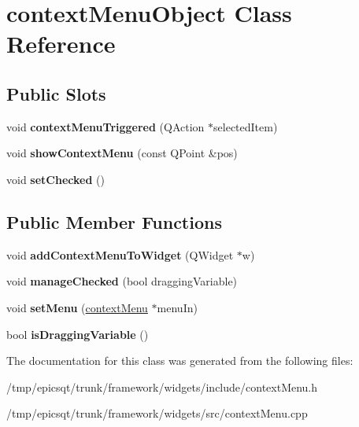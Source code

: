 \hypertarget{classcontextMenuObject}{
\section{contextMenuObject Class Reference}
\label{classcontextMenuObject}
}
\subsection*{Public Slots}
\begin{DoxyCompactItemize}
\item 
\hypertarget{classcontextMenuObject_a832f6bf39f7f9140248cf0cc5fc6956b}{
void {\bfseries contextMenuTriggered} (QAction $\ast$selectedItem)}
\label{classcontextMenuObject_a832f6bf39f7f9140248cf0cc5fc6956b}

\item 
\hypertarget{classcontextMenuObject_a504e51923167cd0ea74d955a4e8d757f}{
void {\bfseries showContextMenu} (const QPoint \&pos)}
\label{classcontextMenuObject_a504e51923167cd0ea74d955a4e8d757f}

\item 
\hypertarget{classcontextMenuObject_a96ffb6c5d39dece7b13a8943ebe0a85b}{
void {\bfseries setChecked} ()}
\label{classcontextMenuObject_a96ffb6c5d39dece7b13a8943ebe0a85b}

\end{DoxyCompactItemize}
\subsection*{Public Member Functions}
\begin{DoxyCompactItemize}
\item 
\hypertarget{classcontextMenuObject_a36c725c35959ad19abf9b13642539334}{
void {\bfseries addContextMenuToWidget} (QWidget $\ast$w)}
\label{classcontextMenuObject_a36c725c35959ad19abf9b13642539334}

\item 
\hypertarget{classcontextMenuObject_a7840a08ca5c558742a2850c2ace91096}{
void {\bfseries manageChecked} (bool draggingVariable)}
\label{classcontextMenuObject_a7840a08ca5c558742a2850c2ace91096}

\item 
\hypertarget{classcontextMenuObject_a54a542f6c725ee95ec0ed3bb9697f208}{
void {\bfseries setMenu} (\hyperlink{classcontextMenu}{contextMenu} $\ast$menuIn)}
\label{classcontextMenuObject_a54a542f6c725ee95ec0ed3bb9697f208}

\item 
\hypertarget{classcontextMenuObject_ad5968dd68e748e20d410dbb73d84a48f}{
bool {\bfseries isDraggingVariable} ()}
\label{classcontextMenuObject_ad5968dd68e748e20d410dbb73d84a48f}

\end{DoxyCompactItemize}


The documentation for this class was generated from the following files:\begin{DoxyCompactItemize}
\item 
/tmp/epicsqt/trunk/framework/widgets/include/contextMenu.h\item 
/tmp/epicsqt/trunk/framework/widgets/src/contextMenu.cpp\end{DoxyCompactItemize}
